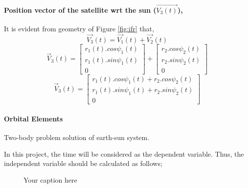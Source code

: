 \documentclass[11pt]{article}
\begin{document}
\paragraph{Position vector of the satellite wrt the sun ($\vec{V_3(t)}$),}

It is evident from geometry of Figure \ref{fig:ifr} that,
\begin{equation}
    \vec{V_3}(t) = \vec{V_1}(t) + \vec{V_2}(t)
\end{equation}
\begin{equation}
    \vec{V}_3(t)  = 
            \begin{bmatrix}
            r_1(t) . cos{\psi_1(t)}  \\
            r_1(t) . sin{\psi_1(t)} \\
             0             
            \end{bmatrix} 
            +
            \begin{bmatrix}
            r_2 . cos{\psi_2(t)}  \\
            r_2 . sin{\psi_2(t)} \\
             0             
            \end{bmatrix}  
\end{equation}
\begin{equation}
    \vec{V}_3(t)  =  
            \begin{bmatrix}
            r_1(t) . cos{\psi_1(t)} +r_2 . cos{\psi_2(t)}  \\
            r_1(t) . sin{\psi_1(t)} +r_2 . sin{\psi_2(t)} \\
             0                                
            \end{bmatrix} 
\end{equation}


\paragraph{Orbital Elements}


Two-body problem solution of earth-sun system\cite{fortescue2011spacecraft}.  
 

In this project, the time will be considered as the dependent variable. Thus, the independent variable should be calculated as follows;

\begin{figure}[h]
\centering
{}
\caption{Your caption here}
\label{fig:2}
\end{figure}
\end{document}
